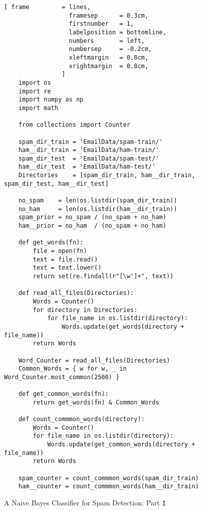 \begin{figure}[!ht]
\centering
\begin{Verbatim}[ frame         = lines, 
                  framesep      = 0.3cm, 
                  firstnumber   = 1,
                  labelposition = bottomline,
                  numbers       = left,
                  numbersep     = -0.2cm,
                  xleftmargin   = 0.8cm,
                  xrightmargin  = 0.8cm,
                ]
    import os
    import re
    import numpy as np
    import math

    from collections import Counter

    spam_dir_train = 'EmailData/spam-train/'
    ham__dir_train = 'EmailData/ham-train/'
    spam_dir_test  = 'EmailData/spam-test/'
    ham__dir_test  = 'EmailData/ham-test/'
    Directories    = [spam_dir_train, ham__dir_train, spam_dir_test, ham__dir_test]
    
    no_spam    = len(os.listdir(spam_dir_train))
    no_ham     = len(os.listdir(ham__dir_train))
    spam_prior = no_spam / (no_spam + no_ham)
    ham__prior = no_ham  / (no_spam + no_ham)

    def get_words(fn):
        file = open(fn)
        text = file.read()
        text = text.lower()
        return set(re.findall(r"[\w']+", text))

    def read_all_files(Directories):
        Words = Counter()
        for directory in Directories:
            for file_name in os.listdir(directory):
                Words.update(get_words(directory + file_name))
        return Words
    
    Word_Counter = read_all_files(Directories)
    Common_Words = { w for w, _ in Word_Counter.most_common(2500) }

    def get_common_words(fn):
        return get_words(fn) & Common_Words

    def count_commmon_words(directory):
        Words = Counter()
        for file_name in os.listdir(directory):
            Words.update(get_common_words(directory + file_name))
        return Words

    spam_counter = count_commmon_words(spam_dir_train)
    ham__counter = count_commmon_words(ham__dir_train)
\end{Verbatim}
\vspace*{-0.3cm}
\caption{A Naive Bayes Classifier for Spam Detection: Part \texttt{I}}
\label{fig:Spam-Detection.ipynb-1}
\end{figure}

